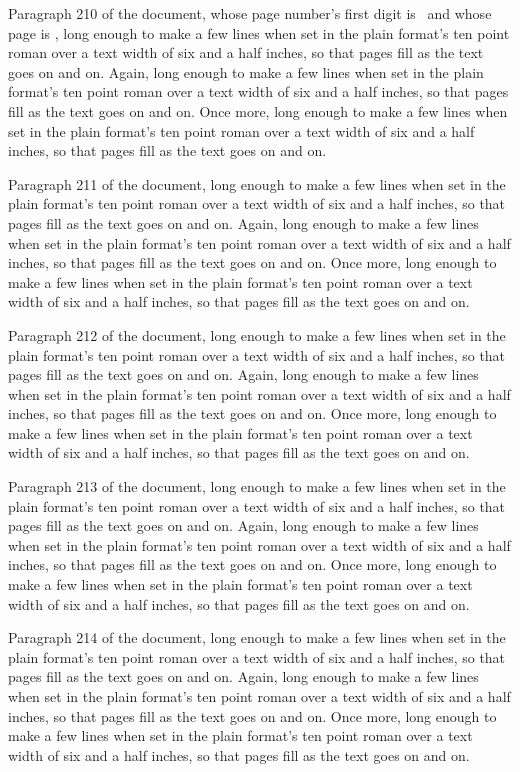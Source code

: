 Paragraph 210 of the document, \def\first#1{(#1)}whose page number's first digit is \expandafter\first\the{}\ and whose page is \number{}, long enough to make a few lines when set in the plain format's ten point roman over a text width of six and a half inches, so that pages fill as the text goes on and on. Again, long enough to make a few lines when set in the plain format's ten point roman over a text width of six and a half inches, so that pages fill as the text goes on and on. Once more, long enough to make a few lines when set in the plain format's ten point roman over a text width of six and a half inches, so that pages fill as the text goes on and on.

Paragraph 211 of the document, long enough to make a few lines when set in the plain format's ten point roman over a text width of six and a half inches, so that pages fill as the text goes on and on. Again, long enough to make a few lines when set in the plain format's ten point roman over a text width of six and a half inches, so that pages fill as the text goes on and on. Once more, long enough to make a few lines when set in the plain format's ten point roman over a text width of six and a half inches, so that pages fill as the text goes on and on.

Paragraph 212 of the document, long enough to make a few lines when set in the plain format's ten point roman over a text width of six and a half inches, so that pages fill as the text goes on and on. Again, long enough to make a few lines when set in the plain format's ten point roman over a text width of six and a half inches, so that pages fill as the text goes on and on. Once more, long enough to make a few lines when set in the plain format's ten point roman over a text width of six and a half inches, so that pages fill as the text goes on and on.

Paragraph 213 of the document, long enough to make a few lines when set in the plain format's ten point roman over a text width of six and a half inches, so that pages fill as the text goes on and on. Again, long enough to make a few lines when set in the plain format's ten point roman over a text width of six and a half inches, so that pages fill as the text goes on and on. Once more, long enough to make a few lines when set in the plain format's ten point roman over a text width of six and a half inches, so that pages fill as the text goes on and on.

Paragraph 214 of the document, long enough to make a few lines when set in the plain format's ten point roman over a text width of six and a half inches, so that pages fill as the text goes on and on. Again, long enough to make a few lines when set in the plain format's ten point roman over a text width of six and a half inches, so that pages fill as the text goes on and on. Once more, long enough to make a few lines when set in the plain format's ten point roman over a text width of six and a half inches, so that pages fill as the text goes on and on.


